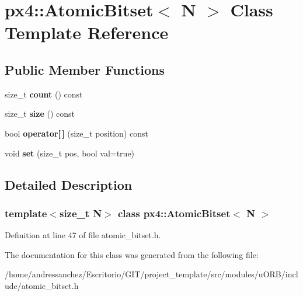 \hypertarget{classpx4_1_1AtomicBitset}{}\section{px4\+:\+:Atomic\+Bitset$<$ N $>$ Class Template Reference}
\label{classpx4_1_1AtomicBitset}
\subsection*{Public Member Functions}
\begin{DoxyCompactItemize}
\item 
\mbox{\label{classpx4_1_1AtomicBitset_a851b25d2589fcbf4008aaaf3399cea6c}} 
size\+\_\+t {\bfseries count} () const
\item 
\mbox{\label{classpx4_1_1AtomicBitset_aee0024e1d72f19d5538ef75ac6039a56}} 
size\+\_\+t {\bfseries size} () const
\item 
\mbox{\label{classpx4_1_1AtomicBitset_a770b80d57203e14bb48e55102d39a218}} 
bool {\bfseries operator\mbox{[}$\,$\mbox{]}} (size\+\_\+t position) const
\item 
\mbox{\label{classpx4_1_1AtomicBitset_a56d398752a2d502f93566cb8bed85037}} 
void {\bfseries set} (size\+\_\+t pos, bool val=true)
\end{DoxyCompactItemize}


\subsection{Detailed Description}
\subsubsection*{template$<$size\+\_\+t N$>$\newline
class px4\+::\+Atomic\+Bitset$<$ N $>$}



Definition at line 47 of file atomic\+\_\+bitset.\+h.



The documentation for this class was generated from the following file\+:\begin{DoxyCompactItemize}
\item 
/home/andressanchez/\+Escritorio/\+G\+I\+T/project\+\_\+template/src/modules/u\+O\+R\+B/include/atomic\+\_\+bitset.\+h\end{DoxyCompactItemize}
